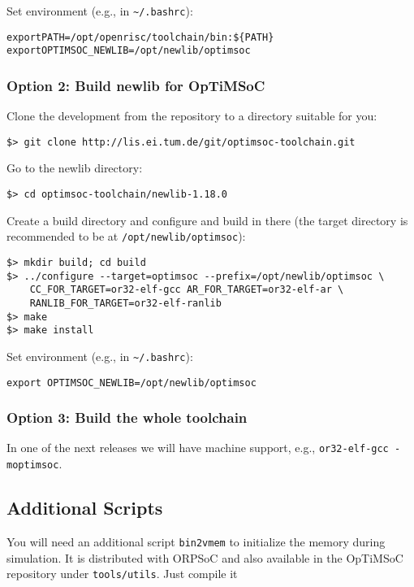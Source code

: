Set environment (e.g., in \verb|~/.bashrc|):

\begin{alltt}
export PATH=/opt/openrisc/toolchain/bin:\$\{PATH\}
export OPTIMSOC_NEWLIB=/opt/newlib/optimsoc
\end{alltt}

\subsubsection{Option 2: Build newlib for OpTiMSoC}

Clone the development from the repository to a directory suitable for
you:

\begin{verbatim}
$> git clone http://lis.ei.tum.de/git/optimsoc-toolchain.git
\end{verbatim}

Go to the newlib directory:

\begin{verbatim}
$> cd optimsoc-toolchain/newlib-1.18.0
\end{verbatim}

Create a build directory and configure and build in there (the target
directory is recommended to be at \verb|/opt/newlib/optimsoc|):

\begin{verbatim}
$> mkdir build; cd build
$> ../configure --target=optimsoc --prefix=/opt/newlib/optimsoc \
    CC_FOR_TARGET=or32-elf-gcc AR_FOR_TARGET=or32-elf-ar \
    RANLIB_FOR_TARGET=or32-elf-ranlib
$> make
$> make install
\end{verbatim}

Set environment (e.g., in \verb|~/.bashrc|):

\begin{verbatim}
export OPTIMSOC_NEWLIB=/opt/newlib/optimsoc
\end{verbatim}


\subsubsection{Option 3: Build the whole toolchain}

In one of the next releases we will have machine support, e.g.,
\verb|or32-elf-gcc -moptimsoc|.

\subsection{Additional Scripts}
You will need an additional script \verb|bin2vmem| to initialize the
memory during simulation. It is distributed with ORPSoC and also
available in the OpTiMSoC repository under \verb|tools/utils|. Just
compile it

